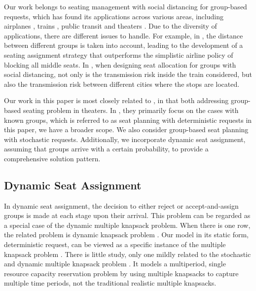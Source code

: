 Our work belongs to seating management with social distancing for group-based requests, which has found its applications across various areas, including airplanes \cite{salari2022social}, trains \cite{haque2023social}, public transit \cite{moore2021seat} and theaters \cite{blom2022filling}. Due to the diversity of applications, there are different issues to handle. For example, in \cite{salari2022social}, the distance between different groups is taken into account, leading to the development of a seating assignment strategy that outperforms the simplistic airline policy of blocking all middle seats. In \cite{haque2023social}, when designing seat allocation for groups with social distancing, not only is the transmission risk inside the train considered, but also the transmission risk between different cities where the stops are located. 

Our work in this paper is most closely related to \cite{blom2022filling}, in that both addressing group-based seating problem in theaters. In \cite{blom2022filling}, they primarily focus on the cases with known groups, which is referred to as seat planning with deterministic requests in this paper, we have a broader scope. We also consider group-based seat planning with stochastic requests. Additionally, we incorporate dynamic seat assignment, assuming that groups arrive with a certain probability, to provide a comprehensive solution pattern.




\subsection{Dynamic Seat Assignment}





In dynamic seat assignment, the decision to either reject or accept-and-assign groups is made at each stage upon their arrival. This problem can be regarded as a special case of the dynamic multiple knapsack problem. When there is one row, the related problem is dynamic knapsack problem \cite{kleywegt1998dynamic}. Our model in its static form, deterministic request, can be viewed as a specific instance of the multiple knapsack problem \cite{pisinger1999exact}. There is little study, only one mildly related to the stochastic and dynamic multiple knapsack problem \cite{perry2009approximate}. It models a multiperiod, single resource capacity reservation problem by using multiple knapsacks to capture multiple time periods, not the traditional realistic multiple knapsacks.


